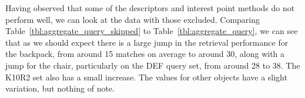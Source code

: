 \documentclass[11pt,a4paper]{kth-mag}
\renewcommand{\textquotedbl}{\texttt{"}}
\newcommand{\ditto}[1][.4pt]{\xrfill{#1}~\textquotedbl~\xrfill{#1}}
\begin{document}

Having observed that some of the descriptors and interest point methods do not
perform well, we can look at the data with those excluded. Comparing
Table~\ref{tbl:aggregate_query_skipped} to Table~\ref{tbl:aggregate_query}, we
can see that as we should expect there is a large jump in the retrieval
performance for the backpack, from around 15 matches on average to around 30,
along with a jump for the chair, particularly on the DEF query set, from around
28 to 38. The K10R2 set also has a small increase. The values for other objects
have a slight variation, but nothing of note.
\end{document}
